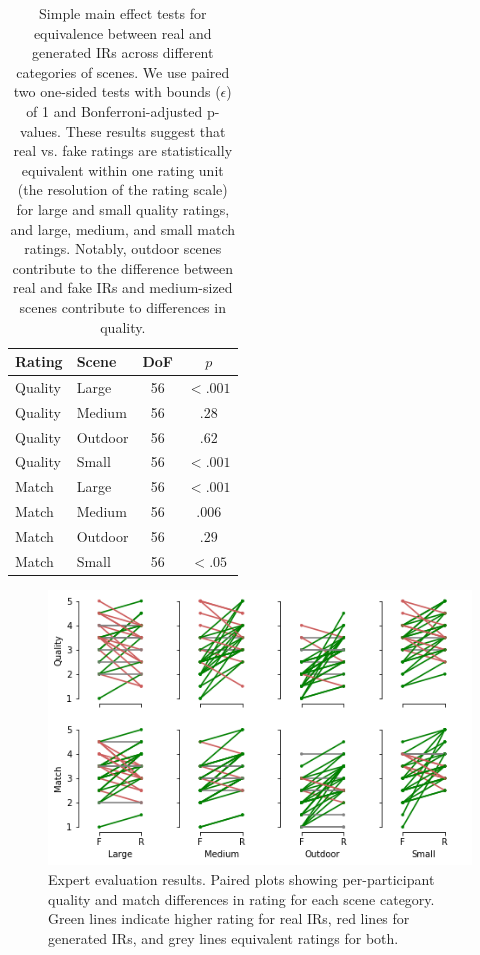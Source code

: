 \documentclass[10pt,twocolumn,letterpaper]{article}
\begin{document}
\begin{table}
    \small
    \centering
    \begin{tabular}{llcc}
        Rating & Scene & DoF & $p$\\
        \hline
        Quality & Large & 56 & \textbf{$<.001$} \\
        Quality & Medium & 56 & $.28$ \\
        Quality & Outdoor & 56 & $.62$ \\
        Quality & Small & 56 & \textbf{$<.001$} \\
        Match & Large & 56 & \textbf{$<.001$} \\
        Match & Medium & 56 & \textbf{$.006$} \\
        Match & Outdoor & 56 & $.29$ \\
        Match & Small & 56 & \textbf{$<.05$} \\
        
    \end{tabular}
    \caption{Simple main effect tests for equivalence between real and generated IRs across different categories of scenes. We use paired two one-sided tests with bounds ($\epsilon$) of 1 and Bonferroni-adjusted p-values. These results suggest that real vs. fake ratings are statistically equivalent within one rating unit (the resolution of the rating scale) for large and small quality ratings, and large, medium, and small match ratings. Notably, outdoor scenes contribute to the difference between real and fake IRs and medium-sized scenes contribute to differences in quality.}
    \label{tab:ratings_maineffects}
\end{table}

\begin{figure}
    \centering
    \includegraphics[width=\columnwidth]{scene_ratings.png}
    \caption{Expert evaluation results. Paired plots showing per-participant quality and match differences in rating for each scene category. Green lines indicate higher rating for real IRs, red lines for generated IRs, and grey lines equivalent ratings for both.}
    \label{fig:ratings}
\end{figure}
\end{document}
